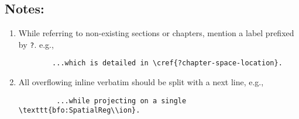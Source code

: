 \subsection*{Notes:}

\begin{enumerate}
    \item While referring to non-existing sections or chapters, mention a label prefixed by \texttt{?}. e.g.,
    \begin{verbatim}
        ...which is detailed in \cref{?chapter-space-location}. 
    \end{verbatim}
    \item All overflowing inline verbatim should be split with a next line, e.g.,
    \begin{verbatim}
         ...while projecting on a single \texttt{bfo:SpatialReg\\ion}.
    \end{verbatim}
\end{enumerate}
